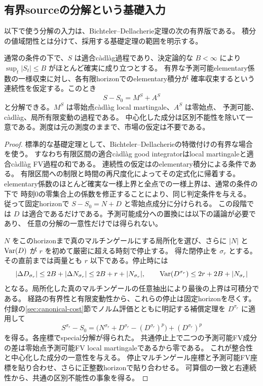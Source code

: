 \subsection{有界sourceの分解という基礎入力}
\label{sec:bounded-source}
以下で使う分解の入力は、Bichteler--Dellacherie定理の次の有界版である。
積分の値域閉性とは分けて、採用する基礎定理の範囲を明示する。

\begin{theorem}\label{thm:bounded-source}
通常の条件の下で、$S$ は適合càdlàg過程であり、決定論的な $B<\infty$ により
$\sup_t|S_t|\leq B$ がほとんど確実に成り立つとする。
有界な予測可能elementary係数の一様収束に対し、各有限horizonでのelementary積分が
確率収束するという連続性を仮定する。このとき
\[
 S-S_0=M^S+A^S
\]
と分解できる。$M^S$ は零始点càdlàg local martingale、$A^S$ は零始点、
予測可能、càdlàg、局所有限変動の過程である。
中心化した成分は区別不能性を除いて一意である。測度は元の測度のままで、市場の仮定は不要である。
\end{theorem}
\begin{proof}
標準的な基礎定理として、Bichteler--Dellacherieの特徴付けの有界な場合を使う。
すなわち有限区間の適合càdlàg good integratorはlocal martingaleと適合càdlàg FV過程の和である。
連続性の仮定は\cite[Definition 1.1 and Theorem 1.2]{BSV}のelementary積分による条件である。
有限区間への制限と時間の再尺度化によってその定式化に帰着する。
elementary係数のほとんど確実な一様上界と全点での一様上界は、通常の条件の下で
時刻0の零集合上の係数を修正することにより、同じ判定条件を与える。
従って固定horizonで $S-S_0=N+D$ と零始点成分に分けられる。
この段階では $D$ は適合であるだけである。予測可能成分への置換には以下の議論が必要であり、
任意の分解の一意性だけでは得られない。

$N$ をこのhorizonまで真のマルチンゲールにする局所化を選び、さらに $|N|$ と
$\operatorname{Var}(D)$ が $r$ を初めて厳密に超える時刻で停止する。
得た閉停止を $\sigma_r$ とする。その直前までは両量とも $r$ 以下である。停止時には
\[
 |\Delta D_{\sigma_r}|
 \leq2B+|\Delta N_{\sigma_r}|
 \leq2B+r+|N_{\sigma_r}|,
 \qquad
 \operatorname{Var}(D^{\sigma_r})\leq2r+2B+|N_{\sigma_r}|
\]
となる。局所化した真のマルチンゲールの任意抽出により最後の上界は可積分である。
経路の有界性と有限変動性から、これらの停止は固定horizonを尽くす。
付録の\ref{sec:canonical-cost}節でノルム評価とともに明記する補償定理を
$D^{\sigma_r}$ に適用して
\[
 S^{\sigma_r}-S_0
 =\bigl(N^{\sigma_r}+D^{\sigma_r}-(D^{\sigma_r})^p\bigr)
   +(D^{\sigma_r})^p
\]
を得る。各座標でspecial分解が得られた。
共通停止上で二つの予測可能FV成分の差は零始点予測可能FV local martingaleであるから零である。
これが整合性と中心化した成分の一意性を与える。
停止マルチンゲール座標と予測可能FV座標を貼り合わせ、さらに正整数horizonで貼り合わせる。
可算個の一致と右連続性から、共通の区別不能性の事象を得る。
\end{proof}

